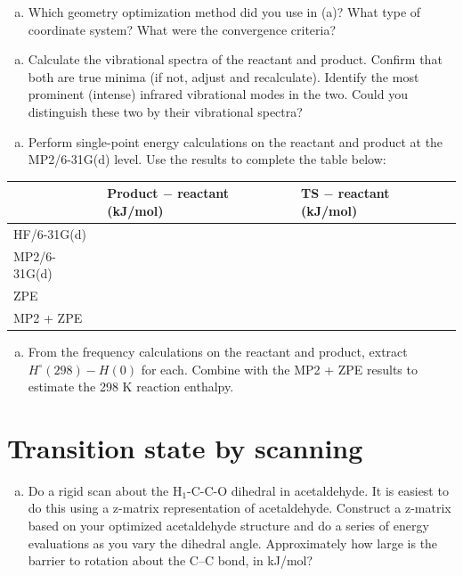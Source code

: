 \documentclass[11pt]{article}
\begin{document}
\begin{enumerate}[(b)]
\item Which geometry optimization method did you use in (a)? What type of coordinate system? What were the convergence criteria?
\end{enumerate}

\begin{enumerate}[(c)]
\item Calculate the vibrational spectra of the reactant and product. Confirm that both are true minima (if not, adjust and recalculate). Identify the most prominent (intense) infrared vibrational modes in the two. Could you distinguish these two by their vibrational spectra?
\end{enumerate}

\begin{enumerate}[(d)]
\item Perform single-point energy calculations on the reactant and product at the MP2/6-31G(d) level.  Use the results to complete the table below:
\end{enumerate}

\begin{center}
\begin{tabular}{lll}
\hline
 & Product $-$ reactant  (kJ/mol) & TS $-$ reactant (kJ/mol)\\
\hline
HF/6-31G(d) &  & \\
MP2/6-31G(d) &  & \\
ZPE &  & \\
MP2 + ZPE &  & \\
\hline
\end{tabular}
\end{center}

\begin{enumerate}[(e)]
\item From the frequency calculations on the reactant and product, extract \( H^{\circ}(298)-H(0) \) for each.  Combine with the MP2 + ZPE results to estimate the 298 K reaction enthalpy.
\end{enumerate}

\section{Transition state by scanning}
\label{sec-2}
\begin{enumerate}[(a)]
\item Do a rigid scan about the H$_{\text{1}}$-C-C-O dihedral in acetaldehyde. It is easiest to do this using a z-matrix representation of acetaldehyde. Construct a z-matrix based on your optimized acetaldehyde structure and do a series of energy evaluations as you vary the dihedral angle. Approximately how large is the barrier to rotation about the C–C bond, in kJ/mol?
\end{enumerate}
\end{document}
